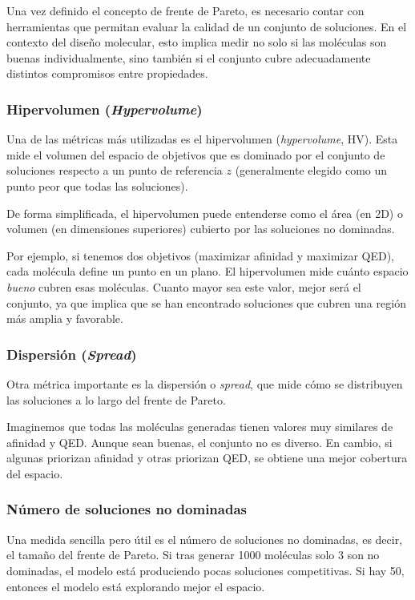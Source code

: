 \documentclass[IB]{TFUOC}%
\begin{document}
Una vez definido el concepto de frente de Pareto, es necesario contar con herramientas que permitan evaluar la calidad de un conjunto de soluciones. En el contexto del diseño molecular, esto implica medir no solo si las moléculas son buenas individualmente, sino también si el conjunto cubre adecuadamente distintos compromisos entre propiedades.

\subsubsection{Hipervolumen (\textit{Hypervolume})}

Una de las métricas más utilizadas es el hipervolumen (\textit{hypervolume}, HV). Esta mide el volumen del espacio de objetivos que es dominado por el conjunto de soluciones respecto a un punto de referencia $z$ (generalmente elegido como un punto peor que todas las soluciones).

De forma simplificada, el hipervolumen puede entenderse como el área (en 2D) o volumen (en dimensiones superiores) cubierto por las soluciones no dominadas.

Por ejemplo, si tenemos dos objetivos (maximizar afinidad y maximizar QED), cada molécula define un punto en un plano. El hipervolumen mide cuánto espacio \textit{bueno}  cubren esas moléculas. Cuanto mayor sea este valor, mejor será el conjunto, ya que implica que se han encontrado soluciones que cubren una región más amplia y favorable.

\subsubsection{Dispersión (\textit{Spread})}

Otra métrica importante es la dispersión o \textit{spread}, que mide cómo se distribuyen las soluciones a lo largo del frente de Pareto.
  
Imaginemos que todas las moléculas generadas tienen valores muy similares de afinidad y QED. Aunque sean buenas, el conjunto no es diverso. En cambio, si algunas priorizan afinidad y otras priorizan QED, se obtiene una mejor cobertura del espacio.


\subsubsection{Número de soluciones no dominadas}

Una medida sencilla pero útil es el número de soluciones no dominadas, es decir, el tamaño del frente de Pareto. Si tras generar 1000 moléculas solo 3 son no dominadas, el modelo está produciendo pocas soluciones competitivas. Si hay 50, entonces el modelo está explorando mejor el espacio.
\end{document}
